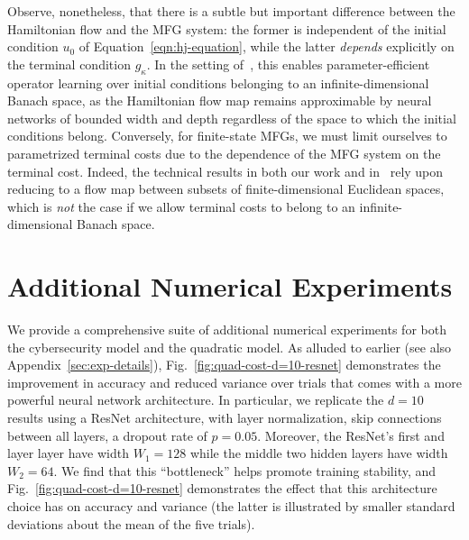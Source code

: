 \documentclass[11pt,reqno]{amsart}
\numberwithin{equation}{section}
\theoremstyle{plain}
\newcommand{\1}{\boldsymbol{\mathbbm{1}}}
\begin{document}
Observe, nonetheless, that there is a subtle but important difference between the Hamiltonian flow and the MFG system: the former is independent of the initial condition $u_0$ of Equation~\eqref{eqn:hj-equation}, while the latter \textit{depends} explicitly on the terminal condition $g_\kappa$. In the setting of~\cite{Lanthaler2025}, this enables parameter-efficient operator learning over initial conditions belonging to an infinite-dimensional Banach space, as the Hamiltonian flow map remains approximable by neural networks of bounded width and depth regardless of the space to which the initial conditions belong. Conversely, for finite-state MFGs, we must limit ourselves to parametrized terminal costs due to the dependence of the MFG system on the terminal cost. Indeed, the technical results in both our work and in~\cite{Lanthaler2025} rely upon reducing to a flow map between subsets of finite-dimensional Euclidean spaces, which is \textit{not} the case if we allow terminal costs to belong to an infinite-dimensional Banach space.

\section{Additional Numerical Experiments}
\label{sec:additional-exps}
We provide a comprehensive suite of additional numerical experiments for both the cybersecurity model and the quadratic model. As alluded to earlier (see also Appendix~\ref{sec:exp-details}), Fig.~\ref{fig:quad-cost-d=10-resnet} demonstrates the improvement in accuracy and reduced variance over trials that comes with a more powerful neural network architecture. In particular, we replicate the $d = 10$ results using a ResNet architecture, with layer normalization, skip connections between all layers, a dropout rate of $p = 0.05$. Moreover, the ResNet's first and layer layer have width $W_1 = 128$ while the middle two hidden layers have width $W_2 = 64$. We find that this ``bottleneck'' helps promote training stability, and Fig.~\ref{fig:quad-cost-d=10-resnet} demonstrates the effect that this architecture choice has on accuracy and variance (the latter is illustrated by smaller standard deviations about the mean of the five trials).
\end{document}
